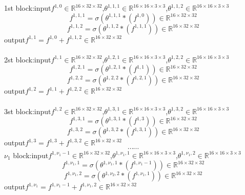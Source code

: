 \begin{enumerate}
1st block:\quad input\quad $f^{1,0}\in \mathbb{R}^{16\times 32\times 32}$,\quad $\theta^{1,1,1} \in \mathbb{R}^{16\times 16\times 3\times 3}$,\quad $\theta^{1,1,2} \in \mathbb{R}^{16\times 16\times 3\times 3}$
$$f^{1,1,1}=\sigma (\theta^{1,1,1} \ast (f^{1,0}))\in \mathbb{R}^{16\times 32\times 32}$$
$$f^{1,1,2}=\sigma (\theta^{1,1,2} \ast (f^{1,1,1}))\in \mathbb{R}^{16\times 32\times 32}$$
\quad\quad\quad\quad\quad output\quad $f^{1,1}=f^{1,0}+f^{1,1,2} \in \mathbb{R}^{16\times 32\times 32}$
\\ \hspace*{\fill} \\
2st block:\quad input\quad $f^{1,1}\in \mathbb{R}^{16\times 32\times 32}$,\quad $\theta^{1,2,1} \in \mathbb{R}^{16\times 16\times 3\times 3}$,\quad $\theta^{1,2,2} \in \mathbb{R}^{16\times 16\times 3\times 3}$
$$f^{1,2,1}=\sigma (\theta^{1,2,1} \ast (f^{1,1}))\in \mathbb{R}^{16\times 32\times 32}$$
$$f^{1,2,2}=\sigma (\theta^{1,2,2} \ast (f^{1,2,1}))\in \mathbb{R}^{16\times 32\times 32}$$
\quad\quad\quad\quad\quad output\quad $f^{1,2}=f^{1,1}+f^{1,2,2} \in \mathbb{R}^{16\times 32\times 32}$
\\ \hspace*{\fill} \\
3st block:\quad input\quad $f^{1,2}\in \mathbb{R}^{16\times 32\times 32}$,\quad $\theta^{1,3,1} \in \mathbb{R}^{16\times 16\times 3\times 3}$,\quad $\theta^{1,3,2} \in \mathbb{R}^{16\times 16\times 3\times 3}$
$$f^{1,3,1}=\sigma (\theta^{1,3,1} \ast (f^{1,3}))\in \mathbb{R}^{16\times 32\times 32}$$
$$f^{1,3,2}=\sigma (\theta^{1,3,2} \ast (f^{1,3,1}))\in \mathbb{R}^{16\times 32\times 32}$$
\quad\quad\quad\quad\quad output\quad $f^{1,3}=f^{1,3}+f^{1,3,2} \in \mathbb{R}^{16\times 32\times 32}$
$$\cdots\cdots$$
$\nu_1$ block:\quad input\quad $f^{1,\nu_1-1}\in \mathbb{R}^{16\times 32\times 32}$,\quad $\theta^{1,\nu_1,1} \in \mathbb{R}^{16\times 16\times 3\times 3}$,\quad $\theta^{1,\nu_1,2} \in \mathbb{R}^{16\times 16\times 3\times 3}$
$$f^{1,\nu_1,1}=\sigma (\theta^{1,\nu_1,1} \ast (f^{1,\nu_1-1}))\in \mathbb{R}^{16\times 32\times 32}$$
$$f^{1,\nu_1,2}=\sigma (\theta^{1,\nu_2,2} \ast (f^{1,\nu_1,1}))\in \mathbb{R}^{16\times 32\times 32}$$
\quad\quad\quad\quad\quad output\quad $f^{1,\nu_1}=f^{1,\nu_1-1}+f^{1,\nu_1,2} \in \mathbb{R}^{16\times 32\times 32}$
\\ \hspace*{\fill} \\

\end{enumerate}
